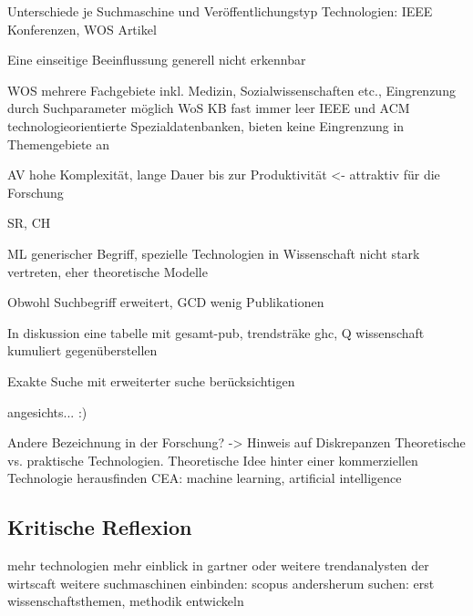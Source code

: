 Unterschiede je Suchmaschine und Veröffentlichungstyp
Technologien: IEEE Konferenzen, WOS Artikel

Eine einseitige Beeinflussung generell nicht erkennbar

WOS mehrere Fachgebiete inkl. Medizin, Sozialwissenschaften etc., Eingrenzung durch Suchparameter möglich
WoS KB fast immer leer
IEEE und ACM technologieorientierte Spezialdatenbanken, bieten keine Eingrenzung in Themengebiete an

AV hohe Komplexität, lange Dauer bis zur Produktivität <- attraktiv für die Forschung

SR, CH

ML generischer Begriff, spezielle Technologien in Wissenschaft nicht stark vertreten, eher theoretische Modelle

Obwohl Suchbegriff erweitert, GCD wenig Publikationen

In diskussion eine tabelle mit gesamt-pub, trendsträke ghc, Q wissenschaft kumuliert gegenüberstellen

Exakte Suche mit erweiterter suche berücksichtigen

angesichts... :)

Andere Bezeichnung in der Forschung? -> Hinweis auf Diskrepanzen
Theoretische vs. praktische Technologien. Theoretische Idee hinter einer kommerziellen Technologie herausfinden
CEA: machine learning, artificial intelligence

\subsection{Kritische Reflexion}
mehr technologien
mehr einblick in gartner oder weitere trendanalysten der wirtscaft
weitere suchmaschinen einbinden: scopus
andersherum suchen: erst wissenschaftsthemen, methodik entwickeln